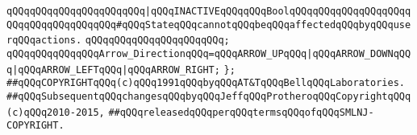 \verb|qQQqqQQqqQQqqQQqqQQqqQQq|\verb#|qQQqINACTIVEqQQqqQQqBoolqQQqqQQqqQQqqQQqqQQqqQQqqQQqqQQqqQQqqQQq#\verb|#qQQqStateqQQqcannotqQQqbeqQQqaffectedqQQqbyqQQquserqQQqactions.|\newline
\verb|qQQqqQQqqQQqqQQqqQQqqQQq;|\newline
\newline
\verb|qQQqqQQqqQQqqQQqArrow_DirectionqQQq=qQQqARROW_UPqQQq|\verb#|qQQqARROW_DOWNqQQq|qQQqARROW_LEFTqQQq|qQQqARROW_RIGHT;#\newline
\newline
\verb|};|\newline
\newline
\newline
\verb|##qQQqCOPYRIGHTqQQq(c)qQQq1991qQQqbyqQQqAT&TqQQqBellqQQqLaboratories.|\newline
\verb|##qQQqSubsequentqQQqchangesqQQqbyqQQqJeffqQQqProtheroqQQqCopyrightqQQq(c)qQQq2010-2015,|\newline
\verb|##qQQqreleasedqQQqperqQQqtermsqQQqofqQQqSMLNJ-COPYRIGHT.|\newline
\newline

